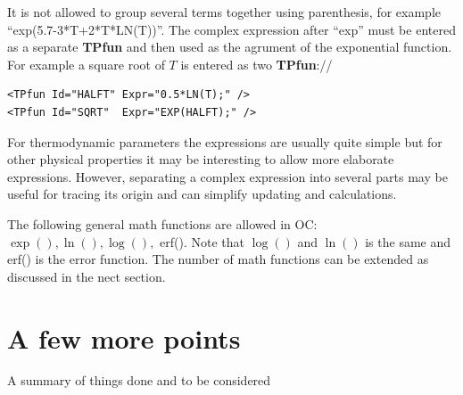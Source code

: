 \documentclass{article}
\begin{document}
It is not allowed to group several terms together using parenthesis,
for example ``exp(5.7-3*T+2*T*LN(T))''.  The complex expression after
``exp'' must be entered as a separate {\bf TPfun} and then used as the
agrument of the exponential function.  For example a square root of
$T$ is entered as two {\bf TPfun}://
\begin{verbatim}
<TPfun Id="HALFT" Expr="0.5*LN(T);" />
<TPfun Id="SQRT"  Expr="EXP(HALFT);" />
\end{verbatim}

For thermodynamic parameters the expressions are usually quite simple
but for other physical properties it may be interesting to allow more
elaborate expressions.  However, separating a complex expression into
several parts may be useful for tracing its origin and can simplify
updating and calculations.
  
The following general math functions are allowed in OC:\\ $\exp(),
\ln(), \log(),$ erf().  Note that $\log()$ and $\ln()$ is the same and
erf() is the error function.  The number of math functions can be
extended as discussed in the nect section.

\section{A few more points}\label{sec:points}

A summary of things done and to be considered
\end{document}
